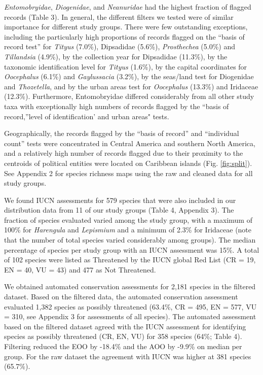 \documentclass[fleqn,10pt,lineno]{wlpeerj} %
\begin{document}
\emph{Entomobryidae}, \emph{Diogenidae}, and \emph{Neanuridae} had the highest fraction of flagged records (Table 3). In general, the different filters we tested were of similar importance for different study groups. There were few outstanding exceptions, including the particularly high proportions of records flagged on the ``basis of record test'' for \emph{Tityus} (7.0\%), Dipsadidae (5.6\%), \emph{Prosthechea} (5.0\%) and \emph{Tillandsia} (4.9\%), by the collection year for Dipsadidae (11.3\%), by the taxonomic identification level for \emph{Tityus} (1.6\%), by the capital coordinates for \emph{Oocephalus} (6.1\%) and \emph{Gaylussacia} (3.2\%), by the seas/land test for Diogenidae and \emph{Thozetella}, and by the urban areas test for \emph{Oocephalus} (13.3\%) and Iridaceae (12.3\%). Furthermore, Entomobryidae differed considerably from all other study taxa with exceptionally high numbers of records flagged by the ``basis of record,''level of identification' and urban areas" tests.

Geographically, the records flagged by the ``basis of record'' and ``individual count'' tests were concentrated in Central America and southern North America, and a relatively high number of records flagged due to their proximity to the centroids of political entities were located on Caribbean islands (Fig. \ref{fig:split}). See Appendix 2 for species richness maps using the raw and cleaned data for all study groups.

We found IUCN assessments for 579 species that were also included in our distribution data from 11 of our study groups (Table 4, Appendix 3). The fraction of species evaluated varied among the study group, with a maximum of 100\% for \emph{Harengula} and \emph{Lepismium} and a minimum of 2.3\% for Iridaceae (note that the number of total species varied considerably among groups). The median percentage of species per study group with an IUCN assessment was 15\%. A total of 102 species were listed as Threatened by the IUCN global Red List (CR = 19, EN = 40, VU = 43) and 477 as Not Threatened.

We obtained automated conservation assessments for 2,181 species in the filtered dataset. Based on the filtered data, the automated conservation assessment evaluated 1,382 species as possibly threatened (63.4\%, CR = 495, EN = 577, VU = 310, see Appendix 3 for assessments of all species). The automated assessment based on the filtered dataset agreed with the IUCN assessment for identifying species as possibly threatened (CR, EN, VU) for 358 species (64\%; Table 4). Filtering reduced the EOO by -18.4\% and the AOO by -9.9\% on median per group. For the raw dataset the agreement with IUCN was higher at 381 species (65.7\%).
\end{document}
